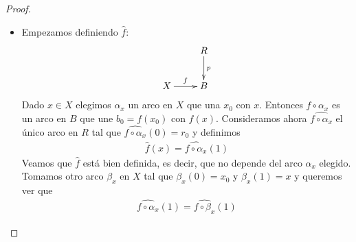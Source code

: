 \begin{teo}
\begin{proof}
\begin{itemize}
            \item [(2) $\Rightarrow$ (1)] Empezamos definiendo $\hat{f}$:
            \begin{gather*}
                \xymatrix{
                    & R \ar[d]^p\\
                    X \ar[r]^f & B
                }
            \end{gather*}
            Dado $x\in X$ elegimos $\alpha_x$ un arco en $X$ que una $x_0$ con $x$. Entonces $f\circ \alpha_x$ es un arco en $B$ que une $b_0 = f(x_0)$ con $f(x)$. Consideramos ahora $\widehat{f\circ \alpha_x}$ el único arco en $R$ tal que $\widehat{f\circ \alpha_x}(0) = r_0$ y definimos 
            \begin{gather*}
                \hat{f}(x) = \widehat{f\circ \alpha_x}(1)
            \end{gather*}
            Veamos que $\hat{f}$ está bien definida, es decir, que no depende del arco $\alpha_x$ elegido. Tomamos otro arco $\beta_x$ en $X$ tal que $\beta_x(0)=x_0$ y $\beta_x(1)=x$ y queremos ver que
            \begin{gather*}
                \widehat{f\circ \alpha_x}(1) = \widehat{f\circ \beta_x}(1)
            \end{gather*}


\end{itemize}
\end{proof}
\end{teo}
